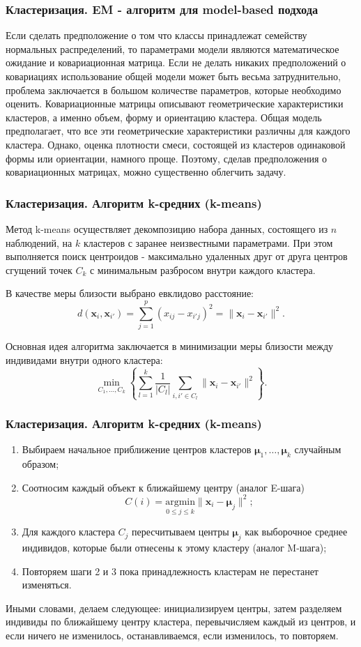 \documentclass[ucs, notheorems, handout]{beamer}
\begin{document}
	\begin{frame}
	\frametitle{Кластеризация. EM - алгоритм для model-based подхода}
		Если сделать предположение о том что классы принадлежат семейству нормальных распределений, то параметрами модели являются математическое ожидание и ковариационная матрица. Если не делать никаких предположений о ковариациях использование общей модели может быть весьма затруднительно, проблема заключается в большом количестве параметров, которые необходимо оценить. Ковариационные матрицы описывают геометрические характеристики кластеров, а именно объем, форму и ориентацию кластера. Общая модель предполагает, что все эти геометрические характеристики различны для каждого кластера. Однако, оценка плотности смеси, состоящей из кластеров одинаковой формы или ориентации, намного проще. Поэтому, сделав предположения о ковариационных матрицах, можно существенно облегчить задачу.
	\end{frame}
	
	\begin{frame}
	\frametitle{Кластеризация. Алгоритм k-средних (k-means)}
		Метод k-means осуществляет декомпозицию набора данных, состоящего из $n$ наблюдений, на $k$ кластеров с заранее неизвестными параметрами. При этом выполняется поиск центроидов - максимально удаленных друг от друга центров сгущений точек $C_k$ с минимальным разбросом внутри каждого кластера. 
	
		В качестве меры близости выбрано евклидово расстояние: $$ d(\pmb x_{i}, \pmb x_{i'}) = \sum\limits_{j=1}^p (x_{ij} - x_{i'j})^{2} = \| \pmb x_{i} - \pmb x_{i'} \|^{2}. $$
		
		Основная идея алгоритма заключается в минимизации меры близости между индивидами внутри одного кластера: $$ \underset{C_{1},\ldots, C_{k}}\min \left\{ \sum\limits_{l=1}^k \frac{1}{|C_{l}|} \sum\limits_{i,i' \in C_{l}} \| \pmb x_{i} - \pmb x_{i'} \|^{2} \right\}. $$
	\end{frame}
	
	\begin{frame}
	\frametitle{Кластеризация. Алгоритм k-средних (k-means)}
		\begin{enumerate}
		\item Выбираем начальное приближение центров кластеров $\pmb \mu_{1},\ldots, \pmb \mu_{k}$ случайным образом; 
		\item Соотносим каждый объект к ближайшему центру (аналог E-шага) $$C(i) = \underset{0 \leq j \leq k}{\text{argmin}} \|\pmb x_{i} - \pmb \mu_{j} \|^{2};$$
		\item Для каждого кластера $C_{j}$ пересчитываем центры $\pmb \mu_{j}$ как выборочное среднее индивидов, которые были отнесены к этому кластеру (аналог M-шага);
		\item  Повторяем шаги 2 и 3 пока принадлежность кластерам не перестанет изменяться.
	\end{enumerate}
		
		Иными словами, делаем следующее: инициализируем центры, затем разделяем индивиды по ближайшему центру кластера, перевычисляем каждый из центров, и если ничего не изменилось, останавливаемся, если изменилось, то повторяем.
	\end{frame}
	
\end{document}
